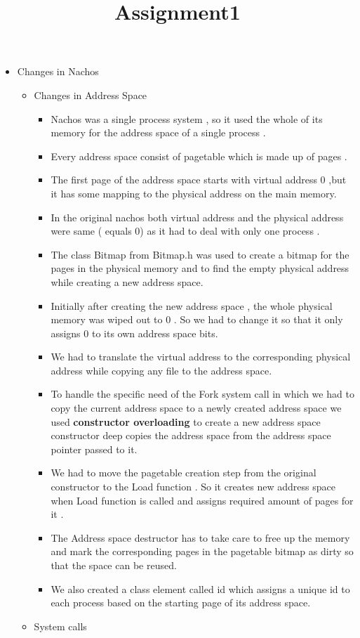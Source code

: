 \documentclass{article}
\title{Assignment1}
\author{}
\date{}
\begin{document}
\maketitle
\begin{itemize}
\item
  Changes in Nachos

  \begin{itemize}
  \item
    Changes in Address Space

    \begin{itemize}
    \item
      Nachos was a single process system , so it used the whole of its
      memory for the address space of a single process .
    \item
      Every address space consist of pagetable which is made up of pages
      .
    \item
      The first page of the address space starts with virtual address 0
      ,but it has some mapping to the physical address on the main
      memory.
    \item
      In the original nachos both virtual address and the physical
      address were same ( equals 0) as it had to deal with only one
      process .
    \item
      The class Bitmap from Bitmap.h was used to create a bitmap for the
      pages in the physical memory and to find the empty physical
      address while creating a new address space.
    \item
      Initially after creating the new address space , the whole
      physical memory was wiped out to 0 . So we had to change it so
      that it only assigns 0 to its own address space bits.
    \item
      We had to translate the virtual address to the corresponding
      physical address while copying any file to the address space.
    \item
      To handle the specific need of the Fork system call in which we
      had to copy the current address space to a newly created address
      space we used \textbf{constructor overloading} to create a new
      address space constructor deep copies the address space from the
      address space pointer passed to it.
    \item
      We had to move the pagetable creation step from the original
      constructor to the Load function . So it creates new address space
      when Load function is called and assigns required amount of pages
      for it .
    \item
      The Address space destructor has to take care to free up the
      memory and mark the corresponding pages in the pagetable bitmap as
      dirty so that the space can be reused.
    \item
      We also created a class element called id which assigns a unique
      id to each process based on the starting page of its address
      space.
    \end{itemize}
  \item
    System calls


\end{itemize}
\end{itemize}
\end{document}

